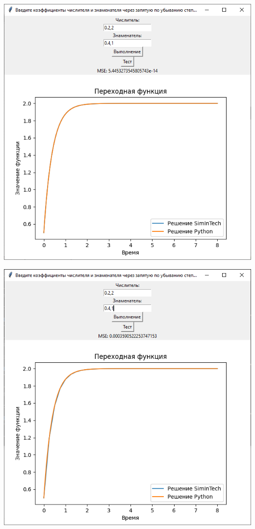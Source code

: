	\begin{center}
		\noindent\begin{minipage}{.4\textwidth}
			\includegraphics[width=\textwidth]{png/graph1.png}
		\end{minipage}
		\begin{minipage}{.4\textwidth}
			\includegraphics[width=\textwidth]{png/graph2.png}
		\end{minipage}
		\label{sravn1}	
	\end{center}
	

